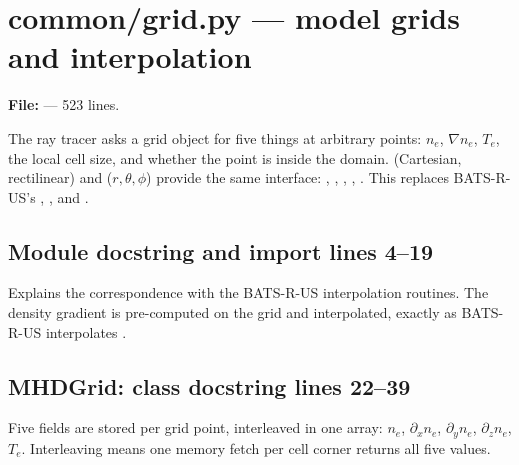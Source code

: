 \chapter{common/grid.py --- model grids and interpolation}
\label{mod:common:grid.py}
\textbf{File:}  --- 523 lines.

The ray tracer asks a grid object for five things at arbitrary points: $n_e$,
$\nabla n_e$, $T_e$, the local cell size, and whether the point is inside the domain.
 (Cartesian, rectilinear) and  ($r,\theta,\phi$) provide the same
interface: , , , , .
This replaces BATS-R-US's , ,
 and .

\section*{\normalsize Module docstring and import \hfill{\small\mdseries\color{gray}lines 4--19}}

Explains the correspondence with the BATS-R-US interpolation routines. The density gradient is pre-computed on the grid and interpolated, exactly as BATS-R-US interpolates .

\section*{\normalsize MHDGrid: class docstring \hfill{\small\mdseries\color{gray}lines 22--39}}

\begin{lines}
\item[L.39] Five fields are stored per grid point, interleaved in one array: $n_e$, $\partial_x n_e$, $\partial_y n_e$, $\partial_z n_e$, $T_e$. Interleaving means one memory fetch per cell corner returns all five values.
\end{lines}
